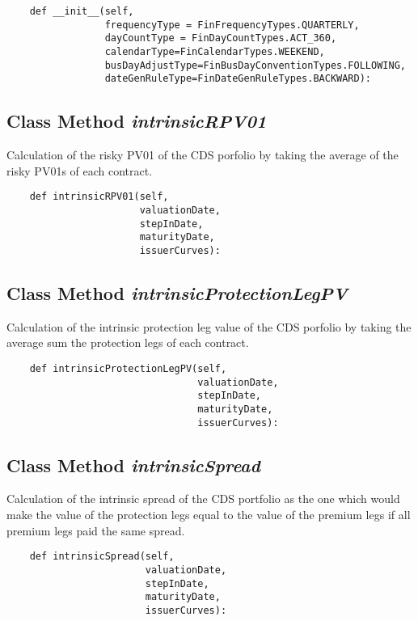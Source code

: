 \documentclass[twoside,11pt]{book}
\begin{document}
\begin{lstlisting}
    def __init__(self,
                 frequencyType = FinFrequencyTypes.QUARTERLY,
                 dayCountType = FinDayCountTypes.ACT_360,
                 calendarType=FinCalendarTypes.WEEKEND,
                 busDayAdjustType=FinBusDayConventionTypes.FOLLOWING,
                 dateGenRuleType=FinDateGenRuleTypes.BACKWARD):
\end{lstlisting}

\subsection{Class Method {\it intrinsicRPV01}}
Calculation of the risky PV01 of the CDS porfolio by taking the average of the risky PV01s of each contract. 

\begin{lstlisting}
    def intrinsicRPV01(self,
                       valuationDate,
                       stepInDate,
                       maturityDate,
                       issuerCurves):
\end{lstlisting}

\subsection{Class Method {\it intrinsicProtectionLegPV}}
Calculation of the intrinsic protection leg value of the CDS porfolio by taking the average sum the protection legs of each contract. 

\begin{lstlisting}
    def intrinsicProtectionLegPV(self,
                                 valuationDate,
                                 stepInDate,
                                 maturityDate,
                                 issuerCurves):
\end{lstlisting}

\subsection{Class Method {\it intrinsicSpread}}
Calculation of the intrinsic spread of the CDS portfolio as the one which would make the value of the protection legs equal to the value of the premium legs if all premium legs paid the same spread. 

\begin{lstlisting}
    def intrinsicSpread(self, 
                        valuationDate,
                        stepInDate,
                        maturityDate,
                        issuerCurves):
\end{lstlisting}
\end{document}
